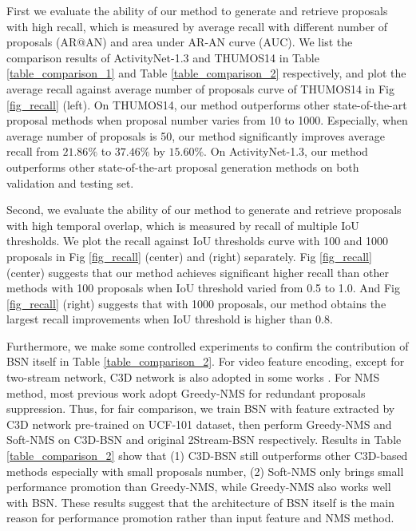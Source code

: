 \documentclass[runningheads]{llncs}
\begin{document}
First we evaluate the ability of our method to generate and retrieve proposals with high recall, which is measured by average recall with different number  of proposals (AR@AN) and area under AR-AN curve (AUC). We list the comparison results of ActivityNet-1.3 and THUMOS14 in Table \ref{table_comparison_1} and Table \ref{table_comparison_2} respectively, and plot the average recall against average number of proposals curve of THUMOS14 in Fig \ref{fig_recall} (left).
On THUMOS14, our method outperforms other state-of-the-art proposal methods when proposal number varies from 10 to 1000. Especially, when average number of proposals is 50, our method significantly improves average recall from $21.86\%$ to $37.46\%$ by $15.60\%$. On ActivityNet-1.3, our method outperforms other state-of-the-art proposal generation methods on both validation and testing set. %


Second, we evaluate the ability of our method to generate and retrieve proposals with high temporal overlap, which is measured by recall of multiple IoU thresholds.
We plot the recall against IoU thresholds curve with 100 and 1000 proposals in Fig \ref{fig_recall} (center) and (right) separately.
Fig \ref{fig_recall} (center) suggests that our method achieves significant higher recall than other methods with 100 proposals when IoU threshold varied from 0.5 to 1.0.
 And Fig \ref{fig_recall} (right) suggests that with 1000 proposals, our method obtains the largest recall improvements when IoU threshold is higher than 0.8.

Furthermore,  we make some controlled experiments to confirm the contribution of BSN itself in Table \ref{table_comparison_2}.
For video feature encoding, except for two-stream network, C3D network \cite{tran2015learning} is also adopted in some works \cite{sst_buch_cvpr17,escorcia2016daps,gao2017turn,shou2016action}. For NMS method, most previous work adopt Greedy-NMS \cite{Dalal2005Histograms} for redundant proposals suppression.
Thus, for fair comparison, we train BSN with feature extracted by C3D network \cite{tran2015learning} pre-trained on UCF-101 dataset, then perform Greedy-NMS and Soft-NMS on C3D-BSN and original 2Stream-BSN respectively.
Results in Table \ref{table_comparison_2} show that (1) C3D-BSN still outperforms other C3D-based methods especially with small proposals number, (2)  Soft-NMS only brings small performance promotion  than Greedy-NMS, while Greedy-NMS also works well with BSN.
These results suggest that the architecture of BSN itself  is the main reason for performance promotion rather than input feature and NMS method.
\end{document}
